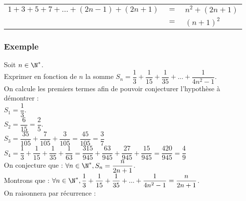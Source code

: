 \vspace*{.3cm}

\begin{tabular}{lll}
$1 + 3 + 5 + 7 + ... + \left(2n-1\right) + \left(2n+1\right)$ & $ = $ & $ n^2 + \left(2n+1\right)$ \vspace*{.3cm} \\
& $=$ & $\left(n+1\right)^2$ \\
\end{tabular}

\newpage

\subsubsection{Exemple }

Soit $n \in \N^*$. \\

Exprimer en fonction de $n$ la somme $S_n = \dfrac{1}{3} + \dfrac{1}{15} + \dfrac{1}{35} + ... + \dfrac{1}{4n^2 - 1}$. \\

On calcule les premiers termes afin de pouvoir conjecturer l'hypothèse à démontrer : \\

$S_1 = \dfrac{1}{3}$. \\

$S_2 = \dfrac{6}{15} = \dfrac{2}{5}$. \\

$S_3 = \dfrac{35}{105} + \dfrac{7}{105} + \dfrac{3}{105} = \dfrac{45}{105} = \dfrac{3}{7}$ \\

$S_4 = \dfrac{1}{3} + \dfrac{1}{15} + \dfrac{1}{35} + \dfrac{1}{63} = \dfrac{315}{945} + \dfrac{63}{945} + \dfrac{27}{945} + \dfrac{15}{945} = \dfrac{420}{945} = \dfrac{4}{9}$ \\

On conjecture que : $\forall n \in \N^*, S_n = \dfrac{n}{2n+1}$. \\

Montrons que : $\forall n \in \N^*, \dfrac{1}{3} + \dfrac{1}{15} + \dfrac{1}{35} + ... + \dfrac{1}{4n^2 - 1} = \dfrac{n}{2n+1}$. \\

On raisonnera par récurrence : \\


